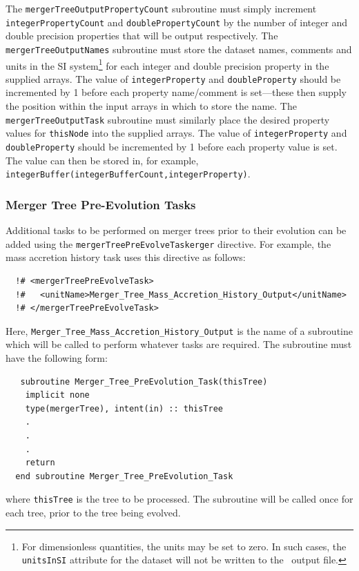 The {\tt mergerTreeOutputPropertyCount} subroutine must simply increment {\tt integerPropertyCount} and {\tt doublePropertyCount} by the number of integer and double precision properties that will be output respectively. The {\tt mergerTreeOutputNames} subroutine must store the dataset names, comments and units in the SI system\footnote{For dimensionless quantities, the units may be set to zero. In such cases, the {\tt unitsInSI} attribute for the dataset will not be written to the \protect\glc\ output file.} for each integer and double precision property in the supplied arrays. The value of {\tt integerProperty} and {\tt doubleProperty} should be incremented by 1 before each property name/comment is set---these then supply the position within the input arrays in which to store the name. The {\tt mergerTreeOutputTask} subroutine must similarly place the desired property values for {\tt thisNode} into the supplied arrays. The value of {\tt integerProperty} and {\tt doubleProperty} should be incremented by 1 before each property value is set. The value can then be stored in, for example, {\tt integerBuffer(integerBufferCount,integerProperty)}.

\subsubsection{Merger Tree Pre-Evolution Tasks}\label{sec:MergerTreePreEvolveTask}

Additional tasks to be performed on merger trees prior to their evolution can be added using the {\tt mergerTreePreEvolveTaskerger} directive. For example, the mass accretion history task uses this directive as follows:
\begin{verbatim}
  !# <mergerTreePreEvolveTask>
  !#   <unitName>Merger_Tree_Mass_Accretion_History_Output</unitName>
  !# </mergerTreePreEvolveTask>
\end{verbatim}
Here, {\tt Merger\_Tree\_Mass\_Accretion\_History\_Output} is the name of a subroutine which will be called to perform whatever tasks are required. The subroutine must have the following form:
\begin{verbatim}
   subroutine Merger_Tree_PreEvolution_Task(thisTree)
    implicit none
    type(mergerTree), intent(in) :: thisTree
    .
    .
    .
    return
  end subroutine Merger_Tree_PreEvolution_Task
\end{verbatim}
where {\tt thisTree} is the tree to be processed. The subroutine will be called once for each tree, prior to the tree being evolved.

